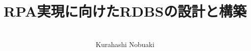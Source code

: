 
\titlehead{\hfill\small\customdate}

\subject{\Large--- プログラム作成業務の自動化 ---}

\title{\huge RPA実現に向けたRDBSの設計と構築}


\date{}

\publishers{}

\author{\ \\\small Kurahashi Nobuaki}

\uppertitleback{\small
This document was created using \TeX{} (\linkLaTeX\kern.15em2$_{\textstyle\varepsilon}$), specifically utilizing tools such as \linkTeXLive{} 2023, up\LaTeX, \linkBibLaTeX\ (\linkBiber), \linkupmendex, \linkPGFTikZ, and many useful packages.\\
The document was edited using \linkTeXStudio{} and \linkSumatraPDF.\\
Numerical calculations were performed using \linkExcel{} and \linkPython.\\
The source codes for the G-code programs were written using \linkVSCode.\\
Version and issue control for these documents were managed using \linkGitHub.\\
Thanks to these tools, with the all-around support of  (\linkMicrosoftCopilot), the creation of the document and system was made possible,
even while navigating solo and finding my way in the quiet corners.
}

